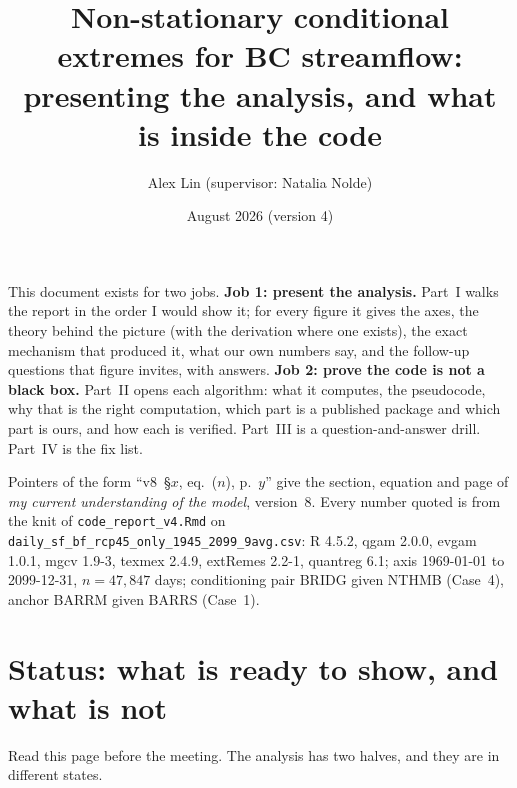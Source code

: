 \documentclass[11pt]{article}
\title{Non-stationary conditional extremes for BC streamflow:\\
presenting the analysis, and what is inside the code}
\author{Alex Lin \quad (supervisor: Natalia Nolde)}
\date{August 2026 \quad (version 4)}
\newcommand{\code}[1]{\texttt{#1}}
\begin{document}
\maketitle

\noindent
This document exists for two jobs. \textbf{Job 1: present the analysis.}
Part~I walks the report in the order I would show it; for every figure it
gives the axes, the theory behind the picture (with the derivation where one
exists), the exact mechanism that produced it, what our own numbers say, and
the follow-up questions that figure invites, with answers. \textbf{Job 2:
prove the code is not a black box.} Part~II opens each algorithm: what it
computes, the pseudocode, why that is the right computation, which part is a
published package and which part is ours, and how each is verified. Part~III
is a question-and-answer drill. Part~IV is the fix list.

Pointers of the form ``v8~\S$x$, eq.~($n$), p.~$y$'' give the section,
equation and page of \emph{my current understanding of the model}, version~8.
Every number quoted is from the knit of \code{code\_report\_v4.Rmd} on
\code{daily\_sf\_bf\_rcp45\_only\_1945\_2099\_9avg.csv}: R 4.5.2, qgam 2.0.0,
evgam 1.0.1, mgcv 1.9-3, texmex 2.4.9, extRemes 2.2-1, quantreg 6.1; axis
1969-01-01 to 2099-12-31, $n = 47{,}847$ days; conditioning pair BRIDG given
NTHMB (Case~4), anchor BARRM given BARRS (Case~1).

\tableofcontents
\newpage

\section{Status: what is ready to show, and what is not}

Read this page before the meeting. The analysis has two halves, and they are
in different states.
\end{document}
